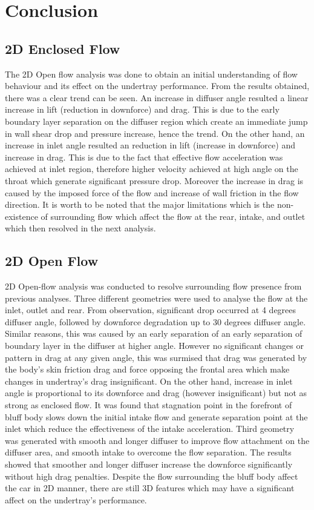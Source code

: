 \newpage
\section{Conclusion}
\justifying
\subsection*{2D Enclosed Flow}
The 2D Open flow analysis was done to obtain an initial understanding of flow behaviour and its effect on the undertray performance. From the results obtained, there was a clear trend can be seen. An increase in diffuser angle resulted a linear increase in lift (reduction in downforce) and drag. This is due to the early boundary layer separation on the diffuser region which create an immediate jump in wall shear drop and pressure increase, hence the trend. On the other hand, an increase in inlet angle resulted an reduction in lift (increase in downforce) and increase in drag. This is due to the fact that effective flow acceleration was achieved at inlet region, therefore higher velocity achieved at high angle on the throat which generate significant pressure drop. Moreover the increase in drag is caused by the imposed force of the flow and increase of wall friction in the flow direction. It is worth to be noted that the major limitations which is the non-existence of surrounding flow which affect the flow at the rear, intake, and outlet which then resolved in the next analysis.


\subsection*{2D Open Flow}
2D Open-flow analysis was conducted to resolve surrounding flow presence from previous analyses. Three different geometries were used to analyse the flow at the inlet, outlet and rear. From observation, significant drop occurred at 4 degrees diffuser angle, followed by downforce degradation up to 30 degrees diffuser angle. Similar reasons, this was caused by an early separation of an early separation of boundary layer in the diffuser at higher angle. However no significant changes or pattern in drag at any given angle, this was surmised that drag was generated by the body's skin friction drag and force opposing the frontal area which make changes in undertray's drag insignificant. On the other hand, increase in inlet angle is proportional to its downforce and drag (however insignificant) but not as strong as enclosed flow. It was found that stagnation point in the forefront of bluff body slows down the initial intake flow and generate separation point at the inlet which reduce the effectiveness of the intake acceleration. Third geometry was generated with smooth and longer diffuser to improve flow attachment on the diffuser area, and smooth intake to overcome the flow separation. The results showed that smoother and longer diffuser increase the downforce significantly without high drag penalties. Despite the flow surrounding the bluff body affect the car in 2D manner, there are still 3D features which may have a significant affect on the undertray's performance.

